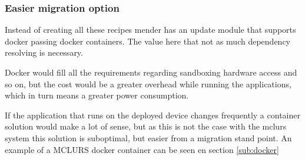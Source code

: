 \documentclass[../../main.tex]{subfiles}
\begin{document}
\subsubsection{Easier migration option}%
\label{ssub:easier_migration_option}

Instead of creating all these recipes mender has an update module that supports docker
passing docker containers. The value here that not as much dependency resolving is necessary.

Docker would fill all the requirements regarding sandboxing hardware access and so on,
but the cost would be a greater overhead while running the applications, which in turn
means a greater power consumption.

If the application that runs on the deployed device changes frequently a container solution
would make a lot of sense, but as this is not the case with the mclurs system this solution
is suboptimal, but easier from a migration stand point.
An example of a MCLURS docker container can be seen en section \ref{sub:docker}
\end{document}
